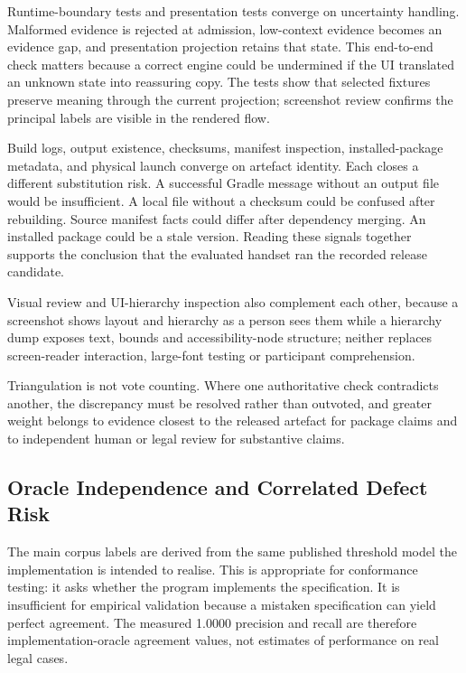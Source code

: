 Runtime-boundary tests and presentation tests converge on uncertainty handling. Malformed evidence is rejected at admission, low-context evidence becomes an evidence gap, and presentation projection retains that state. This end-to-end check matters because a correct engine could be undermined if the UI translated an unknown state into reassuring copy. The tests show that selected fixtures preserve meaning through the current projection; screenshot review confirms the principal labels are visible in the rendered flow.

Build logs, output existence, checksums, manifest inspection, installed-package metadata, and physical launch converge on artefact identity. Each closes a different substitution risk. A successful Gradle message without an output file would be insufficient. A local file without a checksum could be confused after rebuilding. Source manifest facts could differ after dependency merging. An installed package could be a stale version. Reading these signals together supports the conclusion that the evaluated handset ran the recorded release candidate.

Visual review and UI-hierarchy inspection also complement each other, because a screenshot shows layout and hierarchy as a person sees them while a hierarchy dump exposes text, bounds and accessibility-node structure; neither replaces screen-reader interaction, large-font testing or participant comprehension.

Triangulation is not vote counting. Where one authoritative check contradicts another, the discrepancy must be resolved rather than outvoted, and greater weight belongs to evidence closest to the released artefact for package claims and to independent human or legal review for substantive claims.

\subsection{Oracle Independence and Correlated Defect Risk}

The main corpus labels are derived from the same published threshold model the implementation is intended to realise. This is appropriate for conformance testing: it asks whether the program implements the specification. It is insufficient for empirical validation because a mistaken specification can yield perfect agreement. The measured 1.0000 precision and recall are therefore implementation-oracle agreement values, not estimates of performance on real legal cases.

